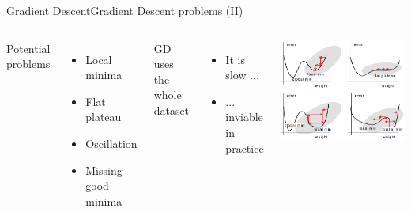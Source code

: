 \documentclass[10pt,compress]{beamer} %
\begin{document}
\begin{frame}{Gradient Descent}{Gradient Descent problems (II)}
    \begin{columns}
		Potential problems
		\begin{itemize}
		\item Local minima
		\item Flat plateau
		\item Oscillation
		\item Missing good minima
		\end{itemize}

		GD uses the whole dataset
		\begin{itemize}
		\item It is slow ... 
		\item ... inviable in practice
		\end{itemize}
	 \begin{center}
	\includegraphics[width=\linewidth]{figs/problems.png}
 	\end{center}
   \end{columns}
\end{frame}
\end{document}
